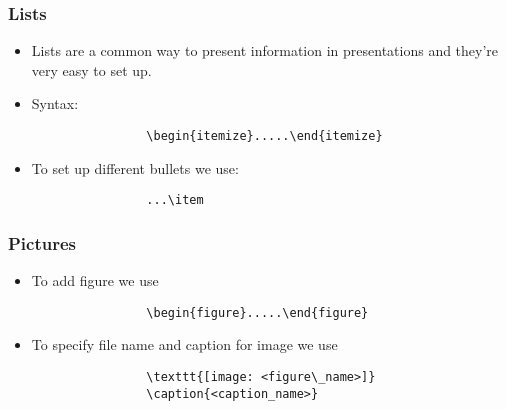 \documentclass{beamer}
\begin{document}
	\begin{frame}[fragile]
		\frametitle{Lists}
		\begin{Large}		
		\begin{itemize}
			\item Lists are a common way to present information in presentations and they're very easy to set up.
			\item Syntax:\\\Large
			\begin{verbatim}
				\begin{itemize}.....\end{itemize}
			\end{verbatim}
			\item To set up different bullets we use:
			\begin{verbatim}
				...\item
			\end{verbatim}
		\end{itemize}
		\end{Large}
	\end{frame}
	\begin{frame}[fragile]
		\frametitle{Pictures}
		\begin{Large}
		\begin{itemize}
			\item To add figure we use\\\Large
			\begin{verbatim}
				\begin{figure}.....\end{figure}
			\end{verbatim}
			\item To specify file name and caption for image we use
			\begin{verbatim}
				\texttt{[image: <figure\_name>]}
				\caption{<caption_name>}
			\end{verbatim}
		\end{itemize}
		\end{Large}
	\end{frame}
\end{document}

